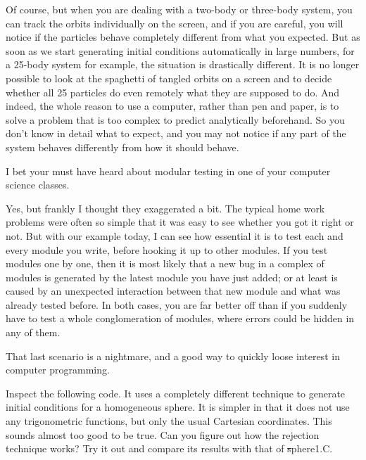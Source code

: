 \carol
Of course, but when you are dealing with a two-body or three-body
system, you can track the orbits individually on the screen, and if
you are careful, you will notice if the particles behave completely
different from what you expected.  But as soon as we start generating
initial conditions automatically in large numbers, for a 25-body
system for example, the situation is drastically different.  It is no
longer possible to look at the spaghetti of tangled orbits on a screen
and to decide whether all 25 particles do even remotely what they are
supposed to do.  And indeed, the whole reason to use a computer,
rather than pen and paper, is to solve a problem that is too complex
to predict analytically beforehand.  So you don't know in detail
what to expect, and you may not notice if any part of the system
behaves differently from how it should behave.

\bob
I bet your must have heard about modular testing in one of your
computer science classes.

\carol
Yes, but frankly I thought they exaggerated a bit.  The typical home
work problems were often so simple that it was easy to see whether
you got it right or not.  But with our example today, I can see how
essential it is to test each and every module you write, before
hooking it up to other modules.  If you test modules one by one, then
it is most likely that a new bug in a complex of modules is generated
by the latest module you have just added; or at least is caused by an
unexpected interaction between that new module and what was already
tested before.  In both cases, you are far better off than if you
suddenly have to test a whole conglomeration of modules, where errors
could be hidden in any of them.

\alice
That last scenario is a nightmare, and a good way to quickly loose
interest in computer programming.

\cba

\begin{Exercise}\label{ex:rejectiontechnique}
Inspect the following code.  It uses a completely different technique
to generate initial conditions for a homogeneous sphere.  It is
simpler in that it does not use any trigonometric functions, but only
the usual Cartesian coordinates.  This sounds almost too good to be
true. Can you figure out how the rejection technique works?  Try it
out and compare its results with that of {\st sphere1.C}.
\end{Exercise}


